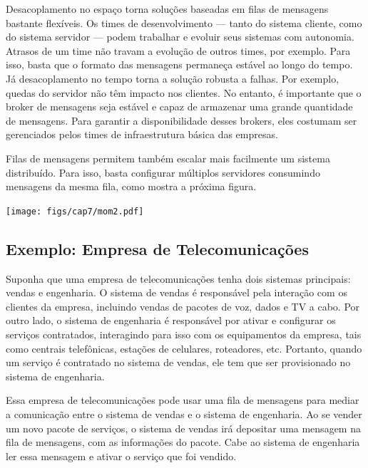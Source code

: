 \documentclass[
  11pt,
  twoside]{book}
\let\origfigure\figure
\let\endorigfigure\endfigure
\renewenvironment{figure}[1][2] {
    \expandafter\origfigure\expandafter[!h]
} {
    \endorigfigure
}
\begin{document}
Desacoplamento no espaço torna soluções baseadas em filas de mensagens
bastante flexíveis. Os times de desenvolvimento --- tanto do sistema
cliente, como do sistema servidor --- podem trabalhar e evoluir seus
sistemas com autonomia. Atrasos de um time não travam a evolução de
outros times, por exemplo. Para isso, basta que o formato das mensagens
permaneça estável ao longo do tempo. Já desacoplamento no tempo torna a
solução robusta a falhas. Por exemplo, quedas do servidor não têm
impacto nos clientes. No entanto, é importante que o broker de mensagens
seja estável e capaz de armazenar uma grande quantidade de mensagens.
Para garantir a disponibilidade desses brokers, eles costumam ser
gerenciados pelos times de infraestrutura básica das empresas.

Filas de mensagens permitem também escalar mais facilmente um sistema
distribuído. Para isso, basta configurar múltiplos servidores consumindo
mensagens da mesma fila, como mostra a próxima figura.

\begin{figure}
\centering
\texttt{[image: figs/cap7/mom2.pdf]}
\caption{Fila de Mensagens com vários consumidores}
\end{figure}

\hypertarget{exemplo-empresa-de-telecomunicauxe7uxf5es}{%
\subsection{Exemplo: Empresa de
Telecomunicações}\label{exemplo-empresa-de-telecomunicauxe7uxf5es}}

Suponha que uma empresa de telecomunicações tenha dois sistemas
principais: vendas e engenharia. O sistema de vendas é responsável pela
interação com os clientes da empresa, incluindo vendas de pacotes de
voz, dados e TV a cabo. Por outro lado, o sistema de engenharia é
responsável por ativar e configurar os serviços contratados, interagindo
para isso com os equipamentos da empresa, tais como centrais
telefônicas, estações de celulares, roteadores, etc. Portanto, quando um
serviço é contratado no sistema de vendas, ele tem que ser provisionado
no sistema de engenharia.

Essa empresa de telecomunicações pode usar uma fila de mensagens para
mediar a comunicação entre o sistema de vendas e o sistema de
engenharia. Ao se vender um novo pacote de serviços, o sistema de vendas
irá depositar uma mensagem na fila de mensagens, com as informações do
pacote. Cabe ao sistema de engenharia ler essa mensagem e ativar o
serviço que foi vendido.
\end{document}
